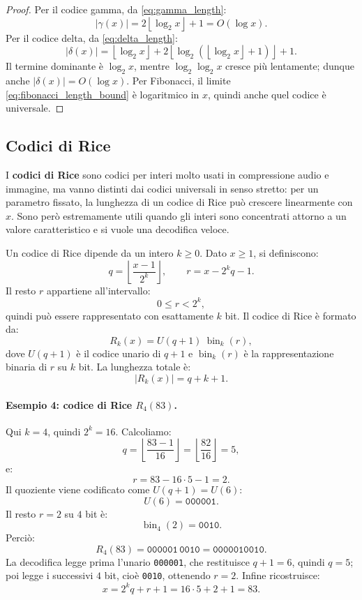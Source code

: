 \documentclass{article}
\theoremstyle{definition}
\numberwithin{equation}{section}
\begin{document}
\begin{proof}
    Per il codice gamma, da \eqref{eq:gamma_length}:
    \[
        |\gamma(x)|
        =
        2\left\lfloor\log_2 x\right\rfloor+1
        =
        O(\log x).
    \]
    Per il codice delta, da \eqref{eq:delta_length}:
    \[
        |\delta(x)|
        =
        \left\lfloor\log_2 x\right\rfloor
        +
        2\left\lfloor\log_2\left(\left\lfloor\log_2 x\right\rfloor+1\right)\right\rfloor
        +
        1.
    \]
    Il termine dominante è $\log_2 x$, mentre $\log_2\log_2 x$ cresce più lentamente; dunque anche $|\delta(x)|=O(\log x)$. Per Fibonacci, il limite \eqref{eq:fibonacci_length_bound} è logaritmico in $x$, quindi anche quel codice è universale.
\end{proof}

\subsection{Codici di Rice}
I \textbf{codici di Rice} sono codici per interi molto usati in compressione audio e immagine, ma vanno distinti dai codici universali in senso stretto: per un parametro fissato, la lunghezza di un codice di Rice può crescere linearmente con $x$. Sono però estremamente utili quando gli interi sono concentrati attorno a un valore caratteristico e si vuole una decodifica veloce.

Un codice di Rice dipende da un intero $k\geq 0$. Dato $x\geq 1$, si definiscono:
\begin{equation}\label{eq:rice_parameters}
    q=\left\lfloor\frac{x-1}{2^k}\right\rfloor,
    \qquad
    r=x-2^kq-1.
\end{equation}
Il resto $r$ appartiene all'intervallo:
\[
    0\leq r<2^k,
\]
quindi può essere rappresentato con esattamente $k$ bit. Il codice di Rice è formato da:
\[
    R_k(x)=U(q+1)\ \operatorname{bin}_k(r),
\]
dove $U(q+1)$ è il codice unario di $q+1$ e $\operatorname{bin}_k(r)$ è la rappresentazione binaria di $r$ su $k$ bit. La lunghezza totale è:
\begin{equation}\label{eq:rice_length}
    |R_k(x)|=q+k+1.
\end{equation}

\paragraph{Esempio 4: codice di Rice $R_4(83)$.}
Qui $k=4$, quindi $2^k=16$. Calcoliamo:
\[
    q=\left\lfloor\frac{83-1}{16}\right\rfloor
    =
    \left\lfloor\frac{82}{16}\right\rfloor
    =
    5,
\]
e:
\[
    r=83-16\cdot 5-1=2.
\]
Il quoziente viene codificato come $U(q+1)=U(6)$:
\[
    U(6)=\texttt{000001}.
\]
Il resto $r=2$ su $4$ bit è:
\[
    \operatorname{bin}_4(2)=\texttt{0010}.
\]
Perciò:
\[
    R_4(83)=\texttt{000001}\,\texttt{0010}
    =
    \texttt{0000010010}.
\]
La decodifica legge prima l'unario \texttt{000001}, che restituisce $q+1=6$, quindi $q=5$; poi legge i successivi $4$ bit, cioè \texttt{0010}, ottenendo $r=2$. Infine ricostruisce:
\[
    x=2^kq+r+1=16\cdot 5+2+1=83.
\]
\end{document}
